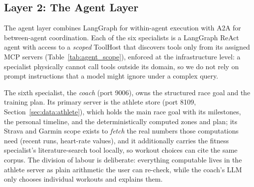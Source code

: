 \subsection{Layer 2: The Agent Layer}\label{sec:architecture:agents}

The agent layer combines LangGraph for within-agent execution with A2A for between-agent coordination. Each of the six specialists is a LangGraph ReAct agent with access to a \textit{scoped} ToolHost that discovers tools only from its assigned MCP servers (Table~\ref{tab:agent_scope}), enforced at the infrastructure level: a specialist physically cannot call tools outside its domain, so we do not rely on prompt instructions that a model might ignore under a complex query.



The sixth specialist, the \textit{coach} (port 9006), owns the structured race goal and the training plan. Its primary server is the athlete store (port 8109, Section~\ref{sec:data:athlete}), which holds the main race goal with its milestones, the personal timeline, and the deterministically computed zones and plan; its Strava and Garmin scope exists to \textit{fetch} the real numbers those computations need (recent runs, heart-rate values), and it additionally carries the fitness specialist's literature-search tool locally, so workout choices can cite the same corpus. The division of labour is deliberate: everything computable lives in the athlete server as plain arithmetic the user can re-check, while the coach's LLM only chooses individual workouts and explains them.

